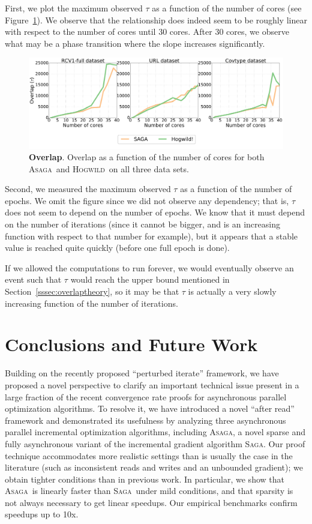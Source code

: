 \documentclass[twoside, 11pt]{article}
\newcommand{\overlap}{\tau}
\newcommand{\ASAGA}{\textsc{Asaga}}
\newcommand{\SAGA}{\textsc{Saga}}
\newcommand{\Hogwild}{\textsc{Hogwild}}
\begin{document}
First, we plot the maximum observed $\overlap$ as a function of the number of cores (see Figure~\ref{fig:overlap}).
We observe that the relationship does indeed seem to be roughly linear with respect to the number of cores until 30 cores.
After 30 cores, we observe what may be a phase transition where the slope increases significantly.

\begin{figure}
	\includegraphics[width=\linewidth]{figures/overlap.pdf}
	\caption{{\bf Overlap}.
		Overlap as a function of the number of cores for both \ASAGA\ and \Hogwild\ on all three data sets.}\label{fig:overlap}
\end{figure}

Second, we measured the maximum observed $\overlap$ as a function of the number of epochs.
We omit the figure since we did not observe any dependency; that is, $\overlap$ does not seem to depend on the number of epochs.
We know that it must depend on the number of iterations (since it cannot be bigger, and is an increasing function with respect to that number for example), but it appears that a stable value is reached quite quickly (before one full epoch is done).

If we allowed the computations to run forever, we would eventually observe an event such that $\overlap$ would reach the upper bound mentioned in Section~\ref{sssec:overlaptheory}, so it may be that $\overlap$ is actually a very slowly increasing function of the number of iterations.


\section{Conclusions and Future Work}
Building on the recently proposed ``perturbed iterate'' framework, we have proposed a novel perspective to clarify an important technical issue present in a large fraction of the recent convergence rate proofs for asynchronous parallel optimization algorithms.
To resolve it, we have introduced a novel ``after read'' framework and demonstrated its usefulness by analyzing three asynchronous parallel incremental optimization algorithms, including \ASAGA, a novel sparse and fully asynchronous variant of the incremental gradient algorithm \SAGA.
Our proof technique accommodates more realistic settings than is usually the case in the literature (such as inconsistent reads and writes and an unbounded gradient); we obtain tighter conditions than in previous work.
In particular, we show that \ASAGA\ is linearly faster than \SAGA\ under mild conditions, and that sparsity is not always necessary to get linear speedups.
Our empirical benchmarks confirm speedups up to 10x.
\end{document}
